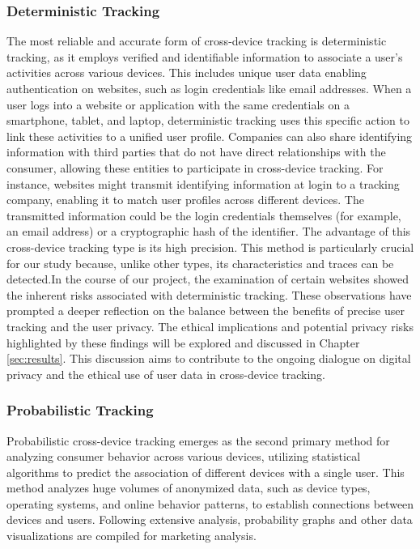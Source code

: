 \subsubsection{Deterministic Tracking}
The most reliable and accurate form of cross-device tracking is deterministic tracking, as it employs verified and identifiable information to associate a user's activities across various devices. This includes unique user data enabling authentication on websites, such as login credentials like email addresses. When a user logs into a website or application with the same credentials on a smartphone, tablet, and laptop, deterministic tracking uses this specific action to link these activities to a unified user profile. Companies can also share identifying information with third parties that do not have direct relationships with the consumer, allowing these entities to participate in cross-device tracking. For instance, websites might transmit identifying information at login to a tracking company, enabling it to match user profiles across different devices. The transmitted information could be the login credentials themselves (for example, an email address) or a cryptographic hash of the identifier.\cite{CdtMeasurements}
The advantage of this cross-device tracking type is its high precision. This method is particularly crucial for our study because, unlike other types, its characteristics and traces can be detected.In the course of our project, the examination of certain websites showed the inherent risks associated with deterministic tracking. These observations have prompted a deeper reflection on the balance between the benefits of precise user tracking and the user privacy. The ethical implications and potential privacy risks highlighted by these findings will be explored and discussed in Chapter \ref{sec:results}. This discussion aims to contribute to the ongoing dialogue on digital privacy and the ethical use of user data in cross-device tracking.

\subsubsection{Probabilistic Tracking}
Probabilistic cross-device tracking emerges as the second primary method for analyzing consumer behavior across various devices, utilizing statistical algorithms to predict the association of different devices with a single user. This method analyzes huge volumes of anonymized data, such as device types, operating systems, and online behavior patterns, to establish connections between devices and users\cite{LiuZhang2021}. Following extensive analysis, probability graphs and other data visualizations are compiled for marketing analysis.


